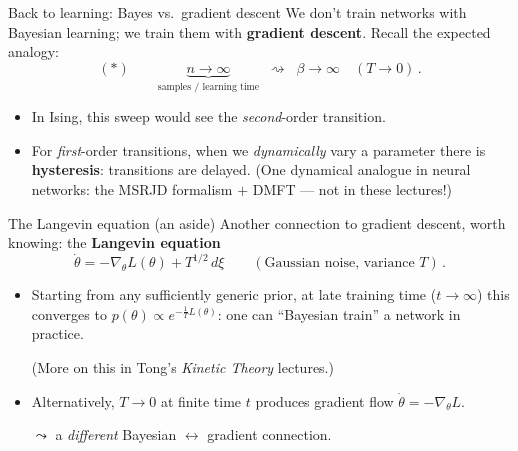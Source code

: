 \documentclass[11pt]{beamer}
\newcommand{\hl}[1]{{\color{blue!60!black}\textbf{#1}}}
\begin{document}
\begin{frame}{Back to learning: Bayes vs.\ gradient descent}
  We don't train networks with Bayesian learning; we train them with
  \hl{gradient descent}. Recall the expected analogy:
  \[
    (*)\qquad
    \underbrace{n \to \infty}_{\text{samples / learning time}}
    \;\;\rightsquigarrow\;\;
    \beta \to \infty \quad (T \to 0)\,.
  \]
  \begin{itemize}
    \item In Ising, this sweep would see the \emph{second}-order transition.
    \item For \emph{first}-order transitions, when we \emph{dynamically}
      vary a parameter there is \hl{hysteresis}: transitions are
      delayed. (One dynamical analogue in neural networks: the
      MSRJD formalism $+$ DMFT --- not in these lectures!)
  \end{itemize}
\end{frame}

\begin{frame}{The Langevin equation (an aside)}
  Another connection to gradient descent, worth knowing: the
  \hl{Langevin equation}
  \[
    \dot\theta = -\nabla_\theta L(\theta) + T^{1/2}\, d\xi
    \qquad (\text{Gaussian noise, variance $T$})\,.
  \]
  \begin{itemize}
    \item Starting from any sufficiently generic prior, at late training time ($t\to \infty$) this
      converges to $p(\theta) \propto e^{-\frac1T L(\theta)}$: one can
      ``Bayesian train'' a network in practice.
      
      (More on this in Tong's \emph{Kinetic Theory} lectures.)
    \item Alternatively, $T\to0$ at finite time $t$ produces gradient flow $\dot\theta = -\nabla_\theta L$.
    
    \medskip
    $\leadsto$ a \emph{different} Bayesian $\leftrightarrow$ gradient connection.
  \end{itemize}
\end{frame}
\end{document}
